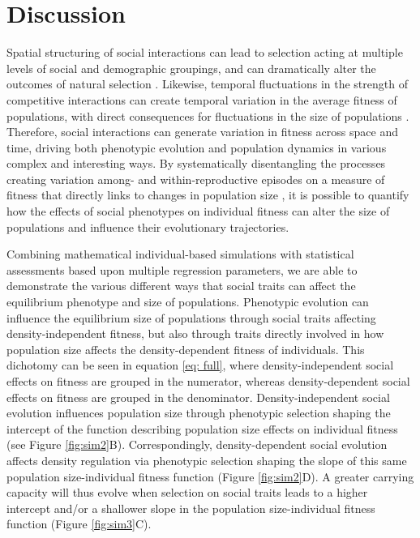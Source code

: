 \documentclass{article}
\begin{document}
\section{Discussion}

Spatial structuring of social interactions can lead to selection acting at multiple levels of social and demographic groupings, and can dramatically alter the outcomes of natural selection \citep{Okasha2004, frank1998foundations, Wolf1999SocialSelection}. Likewise, temporal fluctuations in the strength of competitive interactions can create temporal variation in the average fitness of populations, with direct consequences for fluctuations in the size of populations \citep{Gilpin1973a}. Therefore, social interactions can generate variation in fitness across space and time, driving both phenotypic evolution and population dynamics in various complex and interesting ways. By systematically disentangling the processes creating variation among- and within-reproductive episodes on a measure of fitness that directly links to changes in population size \citep{Saether2015}, it is possible to quantify how the effects of social phenotypes on individual fitness can alter the size of populations and influence their evolutionary trajectories. 

Combining mathematical individual-based simulations with statistical assessments based upon multiple regression parameters, we are able to demonstrate the various different ways that social traits can affect the equilibrium phenotype and size of populations. Phenotypic evolution can influence the equilibrium size of populations through social traits affecting density-independent fitness, but also through traits directly involved in how population size affects the density-dependent fitness of individuals. This dichotomy can be seen in equation \ref{eq: full}, where density-independent social effects on fitness are grouped in the numerator, whereas density-dependent social effects on fitness are grouped in the denominator. Density-independent social evolution  influences population size through  phenotypic selection shaping the intercept of the function describing population size effects on individual fitness (see Figure \ref{fig:sim2}B). Correspondingly, density-dependent social evolution affects density regulation via phenotypic selection shaping the slope of this same population size-individual fitness function (Figure \ref{fig:sim2}D). A greater carrying capacity will thus evolve when selection on social traits leads to a higher intercept and/or a shallower slope in the population size-individual fitness function (Figure \ref{fig:sim3}C). 
\end{document}
